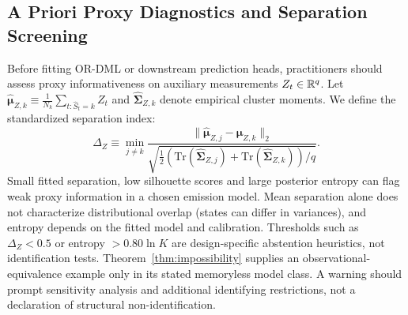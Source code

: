 \subsection{A Priori Proxy Diagnostics and Separation Screening}
\label{app:proxy_diagnostics}
Before fitting OR-DML or downstream prediction heads, practitioners should assess proxy informativeness on auxiliary measurements $Z_t \in \mathbb{R}^q$. Let $\hat{\boldsymbol{\mu}}_{Z,k} \equiv \frac{1}{N_k}\sum_{t: \hat{S}_t=k} Z_t$ and $\hat{\boldsymbol{\Sigma}}_{Z,k}$ denote empirical cluster moments. We define the standardized separation index:
\begin{equation}
    \Delta_Z \equiv \min_{j \neq k} \frac{\|\hat{\boldsymbol{\mu}}_{Z,j} - \hat{\boldsymbol{\mu}}_{Z,k}\|_2}{\sqrt{\frac{1}{2}(\mathrm{Tr}(\hat{\boldsymbol{\Sigma}}_{Z,j}) + \mathrm{Tr}(\hat{\boldsymbol{\Sigma}}_{Z,k}))/q}}.
\end{equation}
Small fitted separation, low silhouette scores and large posterior entropy can flag weak proxy information in a chosen emission model. Mean separation alone does not characterize distributional overlap (states can differ in variances), and entropy depends on the fitted model and calibration. Thresholds such as $\Delta_Z<0.5$ or entropy $>0.80\ln K$ are design-specific abstention heuristics, not identification tests. Theorem~\ref{thm:impossibility} supplies an observational-equivalence example only in its stated memoryless model class. A warning should prompt sensitivity analysis and additional identifying restrictions, not a declaration of structural non-identification.


